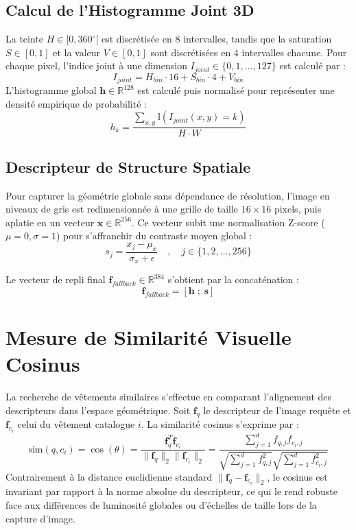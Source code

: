 \documentclass[12pt,a4paper]{article}
\begin{document}
\subsection{Calcul de l'Histogramme Joint 3D}
La teinte $H \in [0, 360^\circ[$ est discrétisée en 8 intervalles, tandis que la saturation $S \in [0, 1]$ et la valeur $V \in [0, 1]$ sont discrétisées en 4 intervalles chacune. Pour chaque pixel, l'indice joint à une dimension $I_{joint} \in \{0, 1, \dots, 127\}$ est calculé par :
\begin{equation}
    I_{joint} = H_{bin} \cdot 16 + S_{bin} \cdot 4 + V_{bin}
\end{equation}
L'histogramme global $\mathbf{h} \in \mathbb{R}^{128}$ est calculé puis normalisé pour représenter une densité empirique de probabilité :
\begin{equation}
    h_k = \frac{\sum_{x,y} \mathbb{I}(I_{joint}(x,y) = k)}{H \cdot W}
\end{equation}

\subsection{Descripteur de Structure Spatiale}
Pour capturer la géométrie globale sans dépendance de résolution, l'image en niveaux de gris est redimensionnée à une grille de taille $16 \times 16$ pixels, puis aplatie en un vecteur $\mathbf{x} \in \mathbb{R}^{256}$. Ce vecteur subit une normalisation Z-score ($\mu=0, \sigma=1$) pour s'affranchir du contraste moyen global :
\begin{equation}
    s_j = \frac{x_j - \mu_x}{\sigma_x + \epsilon} \quad , \quad j \in \{1, 2, \dots, 256\}
\end{equation}

Le vecteur de repli final $\mathbf{f}_{fallback} \in \mathbb{R}^{384}$ s'obtient par la concaténation :
\begin{equation}
    \mathbf{f}_{fallback} = \left[ \mathbf{h} \; ; \; \mathbf{s} \right]
\end{equation}

\section{Mesure de Similarité Visuelle Cosinus}
La recherche de vêtements similaires s'effectue en comparant l'alignement des descripteurs dans l'espace géométrique. Soit $\mathbf{f}_q$ le descripteur de l'image requête et $\mathbf{f}_{c_i}$ celui du vêtement catalogue $i$. La similarité cosinus s'exprime par :
\begin{equation}
    \text{sim}(q, c_i) = \cos(\theta) = \frac{\mathbf{f}_q^T \mathbf{f}_{c_i}}{\|\mathbf{f}_q\|_2 \|\mathbf{f}_{c_i}\|_2} = \frac{\sum_{j=1}^{d} f_{q,j} f_{c_i,j}}{\sqrt{\sum_{j=1}^{d} f_{q,j}^2} \sqrt{\sum_{j=1}^{d} f_{c_i,j}^2}}
\end{equation}
Contrairement à la distance euclidienne standard $\|\mathbf{f}_q - \mathbf{f}_{c_i}\|_2$, le cosinus est invariant par rapport à la norme absolue du descripteur, ce qui le rend robuste face aux différences de luminosité globales ou d'échelles de taille lors de la capture d'image.
\end{document}
